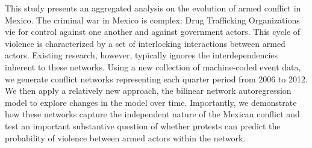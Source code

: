 This study presents an aggregated analysis on the evolution of armed conflict in Mexico. The criminal war in Mexico is  complex: Drug Trafficking Organizations vie for control against one another and against government actors. This cycle of violence is characterized by a set of interlocking interactions between armed actors. Existing research, however, typically ignores the interdependencies inherent to these networks.  Using a new collection of machine-coded event data, we generate conflict networks representing each quarter period from 2006 to 2012.   We then apply a relatively new approach, the bilinear network autoregression model to explore changes in the model over time. Importantly, we demonstrate how these networks capture the independent nature of the Mexican conflict and test an important substantive question of whether protests can predict the probability of violence between armed actors within the network.  